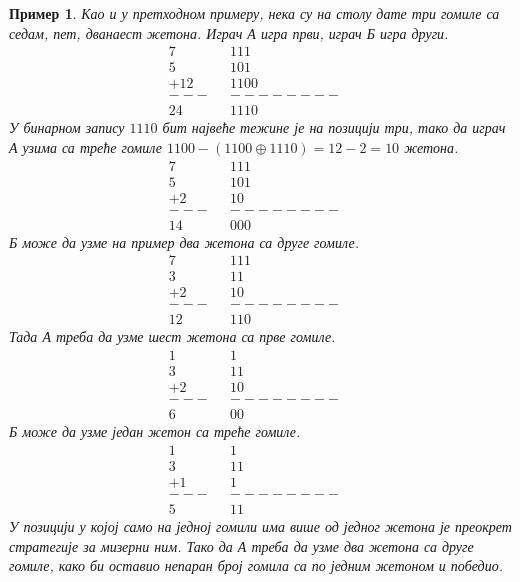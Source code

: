 \documentclass[a4paper]{article}
\newtheorem{example}{Пример}
\begin{document}
\begin{example}
	Као и у претходном примеру, нека су на столу дате три гомиле са седам, пет, дванаест жетона. Играч \textit{А} игра први, играч \textit{Б} игра други.	
		\begin{align*}
			7&		&   1 1 1&\\
			5&		&   1 0 1&\\
			+12&	& 1 1 0 0&\\
			---&	&--------&\\
			24&		& 1 1 1 0
		\end{align*}		
	У бинарном запису $ 1 1 1 0 $ бит највеће тежине је на позицији три, тако да играч \textit{А} узима са треће гомиле $ 1 1 0 0 - (1 1 0 0 \oplus  1 1 1 0) = 12 - 2 = 10 $  жетона.	
		\begin{align*}
			7&		&  	1 1 1&\\
			5&		&   1 0 1&\\
			+2&		&  	  1 0&\\
			---&	&--------&\\
			14&		&   0 0 0
		\end{align*}
	\textit{Б} може да узме на пример два жетона са друге гомиле.
		\begin{align*}
			7&		&   1 1 1&\\
			3&		&     1 1&\\
			+2&		&  	  1 0&\\
			---&	&--------&\\
			12&		&   1 1 0
		\end{align*}
	Тада \textit{А} треба да узме шест жетона са прве гомиле.
		\begin{align*}
			1&		&       1&\\
			3&		&     1 1&\\
			+2&		&  	  1 0&\\
			---&	&--------&\\
			6&		&     0 0
		\end{align*}
	\textit{Б} може да узме један жетон са треће гомиле.
		\begin{align*}
			1&		&       1&\\
			3&		&     1 1&\\
			+1&		&  	  	1&\\
			---&	&--------&\\
			5&		&     1 1
		\end{align*}	
	У позицији у којој само на једној гомили има више од једног жетона је преокрет стратегије за мизерни ним. Тако да \textit{А} треба да узме два жетона са друге гомиле, како би оставио непаран број гомила са по једним жетоном и победио.

\end{example}
\end{document}
